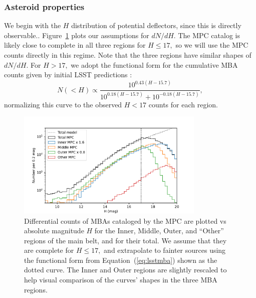 \documentclass[linenumbers, onecolumn]{aastex631}
\newcommand{\eqq}[1]{Equation~(\ref{#1})}
\newcommand\edited[1]{{\color{red} {#1}}}
\begin{document}
\subsubsection{Asteroid properties}
\label{sec:mbaprops}
We \edited{begin with} the $H$ distribution of potential deflectors,
\edited{since this is directly observable.}.
Figure~\ref{fig:counts} plots our assumptions for $dN/dH.$  The MPC
catalog is likely close to complete in all three regions for $H\le17,$
so we will use the MPC counts directly in this regime.  Note that the
three regions have similar shapes of $dN/dH.$  For $H>17,$ we adopt
the functional form for the cumulative MBA counts given by
initial LSST predictions \citep{lsstbook}:
\begin{equation}
  N(<H) \propto \frac{10^{0.43(H-15.7)}}{10^{0.18(H-15.7)} +
    10^{-0.18(H-15.7)}},
\label{eq:lsstmba}
\end{equation}
normalizing this curve to the observed $H<17$ counts for each region.
\begin{figure}
  \centering
  \includegraphics[width=0.8\textwidth]{mbacounts.pdf}
  \caption{Differential counts of MBAs cataloged by the MPC are
    plotted vs absolute magnitude $H$  
    for the Inner, Middle, Outer, and ``Other'' regions of
    the main belt, and for their total.  We assume that they are
    complete for $H\le17,$ and extrapolate to fainter sources using
    the functional form from \eqq{eq:lsstmba} shown as the dotted
    curve. The Inner and Outer regions are slightly rescaled to help
    visual comparison of the curves' shapes in the three MBA regions.}
  \label{fig:counts}
\end{figure}
\end{document}
